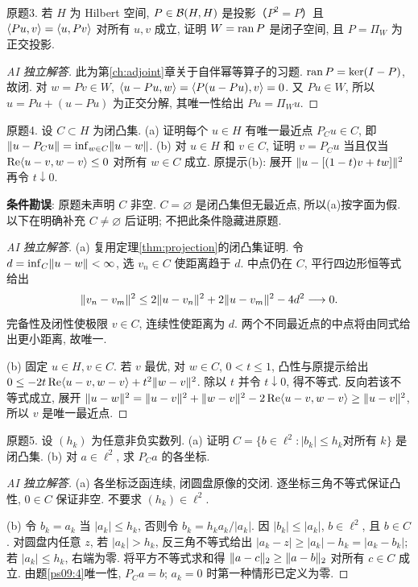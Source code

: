 \begin{exercise}\label{ps09:3}
原题3. 若 $H$ 为 Hilbert 空间, $P\in\mathcal B(H,H)$ 是投影（$P^2=P$）且 $\langle Pu,v\rangle=\langle u,Pv\rangle$ 对所有 $u,v$ 成立, 证明 $W=\operatorname{ran} P$ 是闭子空间, 且 $P=\Pi_W$ 为正交投影.
\end{exercise}
\begin{proof}[AI 独立解答]
此为第\ref{ch:adjoint}章关于自伴幂等算子的习题. $\operatorname{ran} P=\ker(I-P)$, 故闭. 对 $w=Pv\in W$, $\langle u-Pu,w\rangle=\langle P(u-Pu),v\rangle=0$. 又 $Pu\in W$, 所以 $u=Pu+(u-Pu)$ 为正交分解, 其唯一性给出 $Pu=\Pi_Wu$.
\end{proof}
\begin{exercise}\label{ps09:4}
原题4. 设 $C\subset H$ 为闭凸集. (a) 证明每个 $u\in H$ 有唯一最近点 $P_Cu\in C$, 即 $\lVert u-P_Cu\rVert=\inf_{w\in C}\lVert u-w\rVert$. (b) 对 $u\in H$ 和 $v\in C$, 证明 $v=P_Cu$ 当且仅当 $\operatorname{Re}\langle u-v,w-v\rangle\le0$ 对所有 $w\in C$ 成立. 原提示(b): 展开 $\lVert u-[(1-t)v+tw]\rVert^2$ 再令 $t\downarrow0$.

\textbf{条件勘误}: 原题未声明 $C$ 非空. $C=\varnothing$ 是闭凸集但无最近点, 所以(a)按字面为假. 以下在明确补充 $C\ne\varnothing$ 后证明; 不把此条件隐藏进原题.
\end{exercise}
\begin{proof}[AI 独立解答]
(a) 复用定理\ref{thm:projection}的闭凸集证明. 令 $d=\inf_C\lVert u-w\rVert<\infty$, 选 $v_n\in C$ 使距离趋于 $d$. 中点仍在 $C$, 平行四边形恒等式给出
\[
\lVert v_n-v_m\rVert^2\le2\lVert u-v_n\rVert^2+2\lVert u-v_m\rVert^2-4d^2\longrightarrow0.
\]
完备性及闭性使极限 $v\in C$, 连续性使距离为 $d$. 两个不同最近点的中点将由同式给出更小距离, 故唯一.

(b) 固定 $u\in H,v\in C$. 若 $v$ 最优, 对 $w\in C$, $0<t\le1$, 凸性与原提示给出 $0\le-2t\operatorname{Re}\langle u-v,w-v\rangle+t^2\lVert w-v\rVert^2$. 除以 $t$ 并令 $t\downarrow0$, 得不等式. 反向若该不等式成立, 展开 $\lVert u-w\rVert^2=\lVert u-v\rVert^2+\lVert w-v\rVert^2-2\operatorname{Re}\langle u-v,w-v\rangle\ge\lVert u-v\rVert^2$, 所以 $v$ 是唯一最近点.
\end{proof}
\begin{exercise}\label{ps09:5}
原题5. 设 $(h_k)$ 为任意非负实数列. (a) 证明 $C=\{b\in\ell^2:|b_k|\le h_k\text{对所有 }k\}$ 是闭凸集. (b) 对 $a\in\ell^2$, 求 $P_Ca$ 的各坐标.
\end{exercise}
\begin{proof}[AI 独立解答]
(a) 各坐标泛函连续, 闭圆盘原像的交闭. 逐坐标三角不等式保证凸性, $0\in C$ 保证非空. 不要求 $(h_k)\in\ell^2$.

(b) 令 $b_k=a_k$ 当 $|a_k|\le h_k$, 否则令 $b_k=h_ka_k/|a_k|$. 因 $|b_k|\le|a_k|$, $b\in\ell^2$, 且 $b\in C$. 对圆盘内任意 $z$, 若 $|a_k|>h_k$, 反三角不等式给出 $|a_k-z|\ge|a_k|-h_k=|a_k-b_k|$; 若 $|a_k|\le h_k$, 右端为零. 将平方不等式求和得 $\lVert a-c\rVert_2\ge\lVert a-b\rVert_2$ 对所有 $c\in C$ 成立. 由题\ref{ps09:4}唯一性, $P_Ca=b$; $a_k=0$ 时第一种情形已定义为零.
\end{proof}
